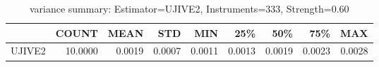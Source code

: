 \begin{table}[ht]
\centering
\caption{variance summary: Estimator=UJIVE2, Instruments=333, Strength=0.60}
\begin{tabular}{lrrrrrrrr}
\toprule
 & COUNT & MEAN & STD & MIN & 25\% & 50\% & 75\% & MAX \\
\midrule
UJIVE2 & 10.0000 & 0.0019 & 0.0007 & 0.0011 & 0.0013 & 0.0019 & 0.0023 & 0.0028 \\
\bottomrule
\end{tabular}
\end{table}
